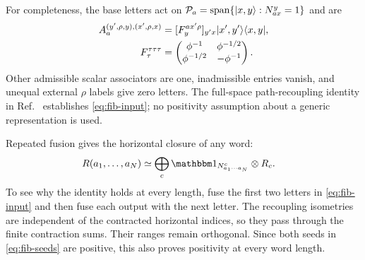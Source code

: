 \documentclass[aps,pra,reprint,nofootinbib,onecolumn]{revtex4-2}
\begin{document}
For completeness, the base letters act on
$\mathcal{P}_a=\operatorname{span}\{\lvert x,y\rangle:N_{ax}^y=1\}$ and are
\begin{align}
	A_a^{(y',\rho,y),(x',\rho,x)}
	 & =[F^{a x'\rho}_{y}]_{y'x}\lvert x',y'\rangle\langle x,y\rvert,
	\nonumber                                         \\
	F^{\tau\tau\tau}_\tau
	 & =\begin{pmatrix}
		    \phi^{-1}   & \phi^{-1/2} \\
		    \phi^{-1/2} & -\phi^{-1}
	    \end{pmatrix}.
\end{align}
Other admissible scalar associators are one, inadmissible entries
vanish, and unequal external $\rho$ labels give zero letters.
The full-space path-recoupling identity in Ref.~\cite{Reviewed}
establishes \cref{eq:fib-input}; no positivity assumption about a
generic representation is used.

Repeated fusion gives the horizontal closure of any word:
\begin{align}
	R(a_1,\ldots,a_N)
	 & \simeq\bigoplus_c
	\Id_{N_{a_1\cdots a_N}^{c}}\otimes R_c.
	\label{eq:word}
\end{align}
To see why the identity holds at every length, fuse the first two
letters in \cref{eq:fib-input} and then fuse each output with the next
letter. The recoupling isometries are independent of the contracted
horizontal indices, so they pass through the finite contraction sums.
Their ranges remain orthogonal. Since both seeds in
\cref{eq:fib-seeds} are positive, this also proves positivity at every
word length.
\end{document}
